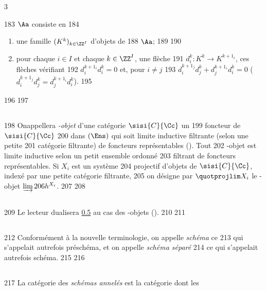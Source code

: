 3	\documentclass[10pt]{../fichiers-configuration-latex/smfart}
\begin{document}
   183	$\Aa$ consiste en
   184	\begin{enumerate}
   185	\renewcommand{\theenumi}{\alph{enumi}}
   186	\renewcommand{\labelenumi}{(\theenumi)}
   187	\item une famille $(K^{k})_{k\in \ZZ^{I}}$ d'objets de
   188	  $\Aa$;
   189	
   190	\item pour chaque $i\in I$ et chaque $k\in \ZZ^{I}$, une flèche
   191	  $d^{k}_i:K^{k}\rightarrow K^{k+1_i}$, ces flèches vérifiant
   192	  $d^{k+1_i}_i d^{k}_i=0$ et, pour $i\neq j$
   193	  $d^{k+1_j}_i d^{k}_j+d^{k+1_i}_j d^{k}_i=0$ (	  $d^{k+1_j}_i d^{k}_j=d^{k+1_i}_j d^{k}_i$).
   195	\end{enumerate}
   196	
   197	\subsection{}
   198	On\pageoriginale appellera \emph{\ppro-objet} d'une catégorie $\sisi{C}{\Cc}$ un
   199	foncteur de $\sisi{C}{\Cc}$
   200	dans $(\Ens)$ qui soit limite inductive filtrante (selon une petite
   201	catégorie filtrante) de foncteurs représentables (\cf {}). Tout
   202	\ppro-objet est limite inductive selon un petit ensemble ordonné
   203	filtrant de foncteurs représentables. Si $X_{i}$ est un système
   204	projectif d'objets de $\sisi{C}{\Cc}$, indexé par une petite catégorie filtrante,
   205	on désigne par $\quotprojlim X_{i}$ le \ppro-objet $\varinjlim
   206	h^{X_i}$.
   207	
   208	\subsection{}
   209	Le lecteur dualisera \hyperref[XVII.subsec0.5]{0.5} au cas des \iind-objets (\Cf {}).
   210	
   211	\subsection{}
   212	Conformément à la nouvelle terminologie, on appelle \emph{schéma} ce
   213	qui s'appelait autrefois préschéma, et on appelle \emph{schéma séparé}
   214	ce qui s'appelait autrefois schéma.
   215	
   216	\subsection{}
   217	La catégorie des \emph{schémas annelés} est la catégorie dont les
\end{document}

